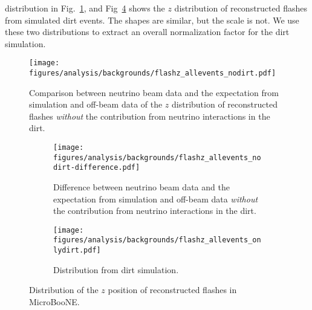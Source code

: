     distribution in Fig.~\ref{fig:flashnodirt}, and Fig~\ref{fig:flashdirt}
    shows the $z$ distribution of reconstructed flashes from simulated dirt
    events. The shapes are similar, but the scale is not. We use these two
    distributions to extract an overall normalization factor for the dirt
    simulation.
    \begin{figure}[ht]
      \centering
      \texttt{[image: figures/analysis/backgrounds/flashz\_allevents\_nodirt.pdf]}
      \caption{Comparison between neutrino beam data and the expectation from
      simulation and off-beam data of the $z$ distribution of reconstructed
      flashes \textit{without} the contribution from neutrino interactions in
      the dirt.}
      \label{fig:flashnodirt}
    \end{figure}
    \begin{figure}[h]
      \centering
      \begin{subfigure}[t]{2.8in}
        \texttt{[image: figures/analysis/backgrounds/flashz\_allevents\_nodirt-difference.pdf]}
        \caption{Difference between neutrino beam data and the expectation from
        simulation and off-beam data \textit{without} the contribution from
        neutrino interactions in the dirt.}
        \label{fig:flashsubtract}
      \end{subfigure}
      \hspace{2pt}
      \begin{subfigure}[t]{2.8in}
        \texttt{[image: figures/analysis/backgrounds/flashz\_allevents\_onlydirt.pdf]}
        \caption{Distribution from dirt simulation.}
        \label{fig:flashdirt}
      \end{subfigure}
      \caption{Distribution of the $z$ position of reconstructed flashes in
      MicroBooNE.}
    \end{figure}
    
